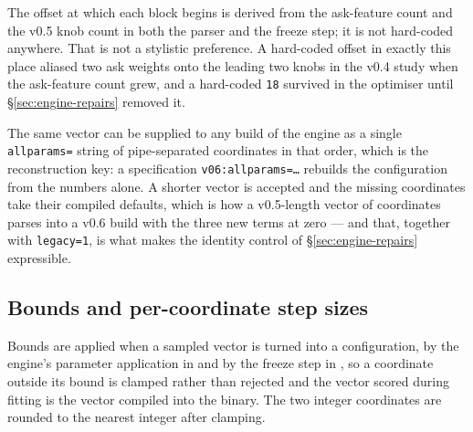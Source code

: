 \noindent The offset at which each block begins is derived from the ask-feature
count and the v0.5 knob count in both the parser and the freeze step; it is not
hard-coded anywhere. That is not a stylistic preference. A hard-coded offset in
exactly this place aliased two ask weights onto the leading two knobs in the v0.4
study when the ask-feature count grew, and a hard-coded \texttt{18} survived in
the optimiser until \S\ref{sec:engine-repairs} removed it.

\begin{table}[ht]
\centering
\caption{The frozen \vsix{} configuration: \numVsixParams{} coordinates in the
order above. Generated by \texttt{engine/build\_tables\_v06.py} from the run
named in the provenance string of \S\ref{app:params-bounds}. This table is a
reproducibility record, not a description of strategy.}
\label{tab:params}
\footnotesize

\end{table}

The same vector can be supplied to any build of the engine as a single
\texttt{allparams=} string of \numVsixParams{} pipe-separated coordinates in that
order, which is the reconstruction key: a specification
\texttt{v06:allparams=\ldots} rebuilds the configuration from the numbers alone.
A shorter vector is accepted and the missing coordinates take their compiled
defaults, which is how a v0.5-length vector of \numVfiveParams{} coordinates
parses into a v0.6 build with the three new terms at zero --- and that, together
with \texttt{legacy=1}, is what makes the identity control of
\S\ref{sec:engine-repairs} expressible.

\subsection{Bounds and per-coordinate step sizes}
\label{app:params-bounds}

Bounds are applied when a sampled vector is turned into a configuration, by the
engine's parameter application in  and by the freeze
step in , so a coordinate outside its bound
is clamped rather than rejected and the vector scored during fitting is the
vector compiled into the binary. The two integer coordinates are rounded to the
nearest integer after clamping.

